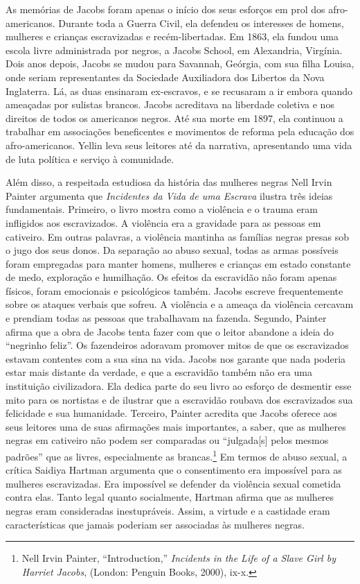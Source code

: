 As memórias de Jacobs foram apenas o início dos seus esforços em prol
dos afro-americanos. Durante toda a Guerra Civil, ela defendeu os
interesses de homens, mulheres e crianças escravizadas e
recém-libertadas. Em 1863, ela fundou uma escola livre administrada por
negros, a Jacobs School, em Alexandria, Virgínia. Dois anos depois,
Jacobs se mudou para Savannah, Geórgia, com sua filha Louisa, onde
seriam representantes da Sociedade Auxiliadora dos Libertos da Nova
Inglaterra. Lá, as duas ensinaram ex-escravos, e se recusaram a ir
embora quando ameaçadas por sulistas brancos. Jacobs acreditava na
liberdade coletiva e nos direitos de todos os americanos negros. Até sua
morte em 1897, ela continuou a trabalhar em associações beneficentes e
movimentos de reforma pela educação dos afro-americanos. Yellin leva
seus leitores até da narrativa, apresentando uma vida de luta política e
serviço à comunidade.

Além disso, a respeitada estudiosa da história das mulheres negras Nell
Irvin Painter argumenta que \emph{Incidentes da Vida de uma Escrava}
ilustra três ideias fundamentais. Primeiro, o livro mostra como a
violência e o trauma eram infligidos aos escravizados. A violência era a
gravidade para as pessoas em cativeiro. Em outras palavras, a violência
mantinha as famílias negras presas sob o jugo dos seus donos. Da
separação ao abuso sexual, todas as armas possíveis foram empregadas
para manter homens, mulheres e crianças em estado constante de medo,
exploração e humilhação. Os efeitos da escravidão não foram apenas
físicos, foram emocionais e psicológicos também. Jacobs escreve
frequentemente sobre os ataques verbais que sofreu. A violência e a
ameaça da violência cercavam e prendiam todas as pessoas que trabalhavam
na fazenda. Segundo, Painter afirma que a obra de Jacobs tenta fazer com
que o leitor abandone a ideia do ``negrinho feliz''. Os fazendeiros
adoravam promover mitos de que os escravizados estavam contentes com a
sua sina na vida. Jacobs nos garante que nada poderia estar mais
distante da verdade, e que a escravidão também não era uma instituição
civilizadora. Ela dedica parte do seu livro ao esforço de desmentir esse
mito para os nortistas e de ilustrar que a escravidão roubava dos
escravizados sua felicidade e sua humanidade. Terceiro, Painter acredita
que Jacobs oferece aos seus leitores uma de suas afirmações mais
importantes, a saber, que as mulheres negras em cativeiro não podem ser
comparadas ou ``julgada{[}s{]} pelos mesmos padrões'' que as livres,
especialmente as brancas.\footnote{Nell Irvin Painter, ``Introduction,''
  \emph{Incidents in the Life of a Slave Girl by Harriet Jacobs},
  (London: Penguin Books, 2000), ix-x.} Em termos de abuso sexual, a
crítica Saidiya Hartman argumenta que o consentimento era impossível
para as mulheres escravizadas. Era impossível se defender da violência
sexual cometida contra elas. Tanto legal quanto socialmente, Hartman
afirma que as mulheres negras eram consideradas inestupráveis. Assim, a
virtude e a castidade eram características que jamais poderiam ser
associadas às mulheres negras.

